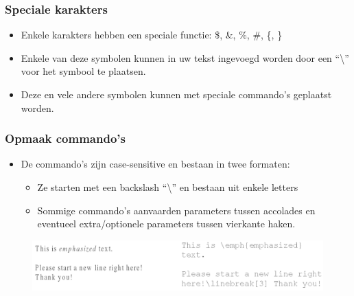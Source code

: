 \documentclass{beamer}
\begin{document}

\begin{frame}
\frametitle{Speciale karakters}
\begin{itemize}
 \item Enkele karakters hebben een speciale functie: \$, \&, \%, \#, \{, \}
 \item Enkele van deze symbolen kunnen in uw tekst ingevoegd worden door een ``\textbackslash'' voor het symbool te plaatsen.
 \item Deze en vele andere symbolen kunnen met speciale commando's geplaatst worden.
\end{itemize}
\end{frame}


\begin{frame}
\frametitle{Opmaak commando's}
\begin{itemize}
 \item De commando's zijn case-sensitive en bestaan in twee formaten:
      \begin{itemize}
      \item Ze starten met een backslash ``\textbackslash'' en bestaan uit enkele letters
      \item Sommige commando's aanvaarden parameters tussen accolades en eventueel extra/optionele parameters tussen vierkante haken.
     \end{itemize}
\end{itemize}
\begin{figure}[h] 
  \includegraphics[width=1\textwidth]{images/command.png}
\end{figure}
\end{frame}

\end{document}
